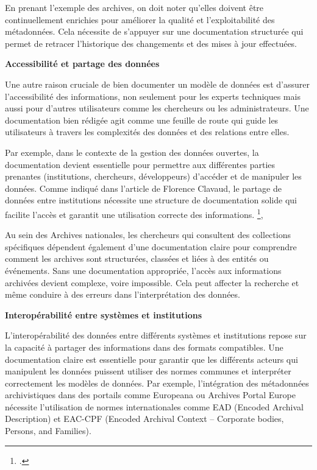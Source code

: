 En prenant l'exemple des archives, on doit noter qu'elles doivent être continuellement enrichies pour améliorer la qualité et l’exploitabilité des métadonnées. Cela nécessite de s'appuyer sur une documentation structurée qui permet de retracer l’historique des changements et des mises à jour effectuées. \newline

\textbf{Accessibilité et partage des données}\newline

Une autre raison cruciale de bien documenter un modèle de données est d'assurer l'accessibilité des informations, non seulement pour les experts techniques mais aussi pour d’autres utilisateurs comme les chercheurs ou les administrateurs. Une documentation bien rédigée agit comme une feuille de route qui guide les utilisateurs à travers les complexités des données et des relations entre elles.\newline

Par exemple, dans le contexte de la gestion des données ouvertes, la documentation devient essentielle pour permettre aux différentes parties prenantes (institutions, chercheurs, développeurs) d'accéder et de manipuler les données. Comme indiqué dans l’article de Florence Clavaud,  le partage de données entre institutions nécessite une structure de documentation solide qui facilite l’accès et garantit une utilisation correcte des informations. \footcite{clavaud}\newline, 

Au sein des Archives nationales, les chercheurs qui consultent des collections spécifiques dépendent également d’une documentation claire pour comprendre comment les archives sont structurées, classées et liées à des entités ou événements. Sans une documentation appropriée, l’accès aux informations archivées devient complexe, voire impossible. Cela peut affecter la recherche et même conduire à des erreurs dans l’interprétation des données.\newline

\textbf{Interopérabilité entre systèmes et institutions}\newline

L'interopérabilité des données entre différents systèmes et institutions repose sur la capacité à partager des informations dans des formats compatibles. Une documentation claire est essentielle pour garantir que les différents acteurs qui manipulent les données puissent utiliser des normes communes et interpréter correctement les modèles de données. Par exemple, l'intégration des métadonnées archivistiques dans des portails comme Europeana ou Archives Portal Europe nécessite l’utilisation de normes internationales comme EAD (Encoded Archival Description) et EAC-CPF (Encoded Archival Context – Corporate bodies, Persons, and Families).\newline

